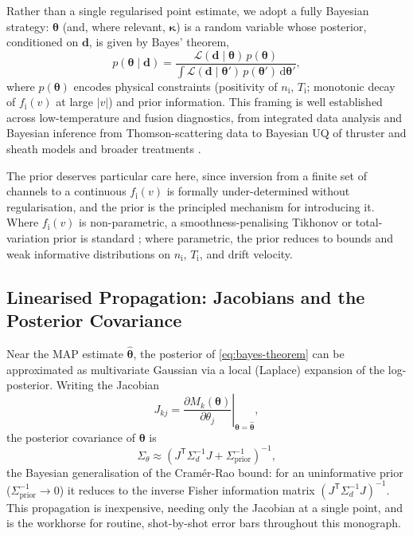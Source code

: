 Rather than a single regularised point estimate, we adopt a fully Bayesian strategy: $\boldsymbol{\theta}$ (and, where relevant, $\boldsymbol{\kappa}$) is a random variable whose posterior, conditioned on $\mathbf{d}$, is given by Bayes' theorem,
\begin{equation}
p(\boldsymbol{\theta} \mid \mathbf{d}) = \frac{\mathcal{L}(\mathbf{d} \mid \boldsymbol{\theta})\, p(\boldsymbol{\theta})}{\int \mathcal{L}(\mathbf{d} \mid \boldsymbol{\theta}')\, p(\boldsymbol{\theta}')\, \mathrm{d}\boldsymbol{\theta}'},
\label{eq:bayes-theorem}
\end{equation}
where $p(\boldsymbol{\theta})$ encodes physical constraints (positivity of $n_{\mathrm{i}}$, $T_{\mathrm{i}}$; monotonic decay of $f_{\mathrm{i}}(v)$ at large $|v|$) and prior information. This framing is well established across low-temperature and fusion diagnostics, from integrated data analysis \cite{ref0706,ref0707,ref0710,ref0713} and Bayesian inference from Thomson-scattering data \cite{ref0683} to Bayesian UQ of thruster and sheath models \cite{ref0719} and broader treatments \cite{ref0727,ref0711}.

The prior deserves particular care here, since inversion from a finite set of channels to a continuous $f_{\mathrm{i}}(v)$ is formally under-determined without regularisation, and the prior is the principled mechanism for introducing it. Where $f_{\mathrm{i}}(v)$ is non-parametric, a smoothness-penalising Tikhonov or total-variation prior is standard \cite{ref0692}; where parametric, the prior reduces to bounds and weak informative distributions on $n_{\mathrm{i}}$, $T_{\mathrm{i}}$, and drift velocity.

\subsection{Linearised Propagation: Jacobians and the Posterior Covariance}
\label{subsec:linearised}

Near the MAP estimate $\hat{\boldsymbol{\theta}}$, the posterior of \cref{eq:bayes-theorem} can be approximated as multivariate Gaussian via a local (Laplace) expansion of the log-posterior. Writing the Jacobian
\begin{equation}
J_{k j} = \left.\frac{\partial M_{k}(\boldsymbol{\theta})}{\partial \theta_{j}}\right|_{\boldsymbol{\theta} = \hat{\boldsymbol{\theta}}},
\label{ch21-eq:jacobian}
\end{equation}
the posterior covariance of $\boldsymbol{\theta}$ is
\begin{equation}
\Sigma_{\theta} \approx \left(J^{\mathsf{T}} \Sigma_{d}^{-1} J + \Sigma_{\text{prior}}^{-1}\right)^{-1},
\label{ch21-eq:posterior-cov}
\end{equation}
the Bayesian generalisation of the Cram\'er-Rao bound: for an uninformative prior ($\Sigma_{\text{prior}}^{-1} \to 0$) it reduces to the inverse Fisher information matrix $(J^{\mathsf{T}} \Sigma_{d}^{-1} J)^{-1}$. This propagation is inexpensive, needing only the Jacobian at a single point, and is the workhorse for routine, shot-by-shot error bars throughout this monograph.

